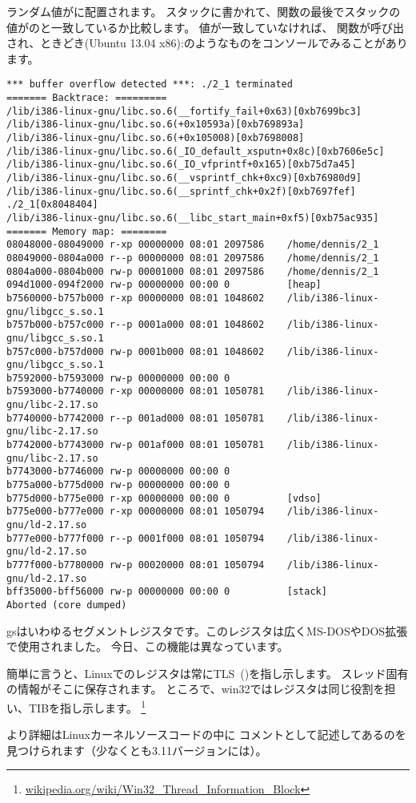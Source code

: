 ランダム値がに配置されます。
スタックに書かれて、関数の最後でスタックの値がのと一致しているか比較します。
値が一致していなければ、
関数が呼び出され、ときどき(Ubuntu 13.04 x86):のようなものをコンソールでみることがあります。

\begin{lstlisting}
*** buffer overflow detected ***: ./2_1 terminated
======= Backtrace: =========
/lib/i386-linux-gnu/libc.so.6(__fortify_fail+0x63)[0xb7699bc3]
/lib/i386-linux-gnu/libc.so.6(+0x10593a)[0xb769893a]
/lib/i386-linux-gnu/libc.so.6(+0x105008)[0xb7698008]
/lib/i386-linux-gnu/libc.so.6(_IO_default_xsputn+0x8c)[0xb7606e5c]
/lib/i386-linux-gnu/libc.so.6(_IO_vfprintf+0x165)[0xb75d7a45]
/lib/i386-linux-gnu/libc.so.6(__vsprintf_chk+0xc9)[0xb76980d9]
/lib/i386-linux-gnu/libc.so.6(__sprintf_chk+0x2f)[0xb7697fef]
./2_1[0x8048404]
/lib/i386-linux-gnu/libc.so.6(__libc_start_main+0xf5)[0xb75ac935]
======= Memory map: ========
08048000-08049000 r-xp 00000000 08:01 2097586    /home/dennis/2_1
08049000-0804a000 r--p 00000000 08:01 2097586    /home/dennis/2_1
0804a000-0804b000 rw-p 00001000 08:01 2097586    /home/dennis/2_1
094d1000-094f2000 rw-p 00000000 00:00 0          [heap]
b7560000-b757b000 r-xp 00000000 08:01 1048602    /lib/i386-linux-gnu/libgcc_s.so.1
b757b000-b757c000 r--p 0001a000 08:01 1048602    /lib/i386-linux-gnu/libgcc_s.so.1
b757c000-b757d000 rw-p 0001b000 08:01 1048602    /lib/i386-linux-gnu/libgcc_s.so.1
b7592000-b7593000 rw-p 00000000 00:00 0
b7593000-b7740000 r-xp 00000000 08:01 1050781    /lib/i386-linux-gnu/libc-2.17.so
b7740000-b7742000 r--p 001ad000 08:01 1050781    /lib/i386-linux-gnu/libc-2.17.so
b7742000-b7743000 rw-p 001af000 08:01 1050781    /lib/i386-linux-gnu/libc-2.17.so
b7743000-b7746000 rw-p 00000000 00:00 0
b775a000-b775d000 rw-p 00000000 00:00 0
b775d000-b775e000 r-xp 00000000 00:00 0          [vdso]
b775e000-b777e000 r-xp 00000000 08:01 1050794    /lib/i386-linux-gnu/ld-2.17.so
b777e000-b777f000 r--p 0001f000 08:01 1050794    /lib/i386-linux-gnu/ld-2.17.so
b777f000-b7780000 rw-p 00020000 08:01 1050794    /lib/i386-linux-gnu/ld-2.17.so
bff35000-bff56000 rw-p 00000000 00:00 0          [stack]
Aborted (core dumped)
\end{lstlisting}

gsはいわゆるセグメントレジスタです。このレジスタは広くMS-DOSやDOS拡張で使用されました。
今日、この機能は異なっています。

簡単に言うと、Linuxでのレジスタは常に\ac{TLS}~()を指し示します。
スレッド固有の情報がそこに保存されます。
ところで、win32ではレジスタは同じ役割を担い、\ac{TIB}を指し示します。
\footnote{\href{http://go.yurichev.com/17104}{wikipedia.org/wiki/Win32\_Thread\_Information\_Block}}

より詳細はLinuxカーネルソースコードの中に
コメントとして記述してあるのを見つけられます（少なくとも3.11バージョンには）。


